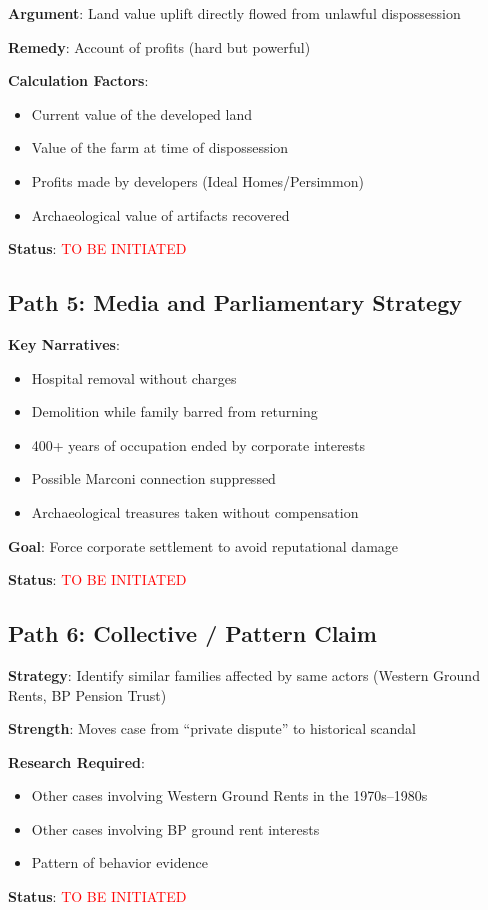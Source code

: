 \documentclass[11pt,a4paper]{article}
\begin{document}
\begin{action}
\textbf{Argument}: Land value uplift directly flowed from unlawful dispossession

\textbf{Remedy}: Account of profits (hard but powerful)

\textbf{Calculation Factors}:
\begin{itemize}
    \item Current value of the developed land
    \item Value of the farm at time of dispossession
    \item Profits made by developers (Ideal Homes/Persimmon)
    \item Archaeological value of artifacts recovered
\end{itemize}

\textbf{Status}: \textcolor{red}{TO BE INITIATED}
\end{action}

\subsection{Path 5: Media and Parliamentary Strategy}

\begin{action}
\textbf{Key Narratives}:
\begin{itemize}
    \item Hospital removal without charges
    \item Demolition while family barred from returning
    \item 400+ years of occupation ended by corporate interests
    \item Possible Marconi connection suppressed
    \item Archaeological treasures taken without compensation
\end{itemize}

\textbf{Goal}: Force corporate settlement to avoid reputational damage

\textbf{Status}: \textcolor{red}{TO BE INITIATED}
\end{action}

\subsection{Path 6: Collective / Pattern Claim}

\begin{action}
\textbf{Strategy}: Identify similar families affected by same actors (Western Ground Rents, BP Pension Trust)

\textbf{Strength}: Moves case from ``private dispute'' to historical scandal

\textbf{Research Required}:
\begin{itemize}
    \item Other cases involving Western Ground Rents in the 1970s--1980s
    \item Other cases involving BP ground rent interests
    \item Pattern of behavior evidence
\end{itemize}

\textbf{Status}: \textcolor{red}{TO BE INITIATED}
\end{action}
\end{document}
